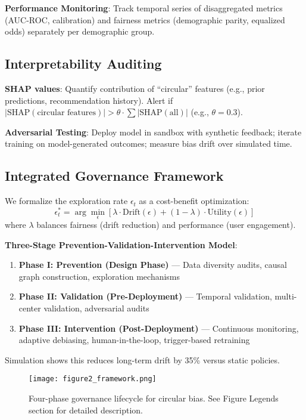 \documentclass[11pt]{article}
\begin{document}
\textbf{Performance Monitoring}: Track temporal series of disaggregated metrics (AUC-ROC, calibration) and fairness metrics (demographic parity, equalized odds) separately per demographic group.

\subsection{Interpretability Auditing}

\textbf{SHAP values}: Quantify contribution of ``circular'' features (e.g., prior predictions, recommendation history). Alert if $|\text{SHAP}(\text{circular features})| > \theta \cdot \sum|\text{SHAP}(\text{all})|$ (e.g., $\theta=0.3$).

\textbf{Adversarial Testing}: Deploy model in sandbox with synthetic feedback; iterate training on model-generated outcomes; measure bias drift over simulated time.

\subsection{Integrated Governance Framework}

We formalize the exploration rate $\epsilon_t$ as a cost-benefit optimization:
\begin{equation}
\epsilon_t^* = \arg\min_{\epsilon} \left[ \lambda \cdot \text{Drift}(\epsilon) + (1-\lambda) \cdot \text{Utility}(\epsilon) \right]
\end{equation}
where $\lambda$ balances fairness (drift reduction) and performance (user engagement).

\textbf{Three-Stage Prevention-Validation-Intervention Model}:
\begin{enumerate}
    \item \textbf{Phase I: Prevention (Design Phase)} — Data diversity audits, causal graph construction, exploration mechanisms
    \item \textbf{Phase II: Validation (Pre-Deployment)} — Temporal validation, multi-center validation, adversarial audits
    \item \textbf{Phase III: Intervention (Post-Deployment)} — Continuous monitoring, adaptive debiasing, human-in-the-loop, trigger-based retraining
\end{enumerate}

Simulation shows this reduces long-term drift by 35\% versus static policies.

\begin{figure}[H]
\centering
\texttt{[image: figure2\_framework.png]}
\caption{Four-phase governance lifecycle for circular bias. See Figure Legends section for detailed description.}
\label{fig:framework}
\end{figure}
\end{document}
